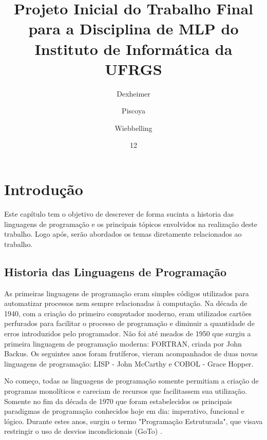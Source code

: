 \documentclass[rel_mlp]{iiufrgs}
\title{Projeto Inicial  do Trabalho Final para a Disciplina de MLP do Instituto de Informática da UFRGS}
\author{Dexheimer}{André}
\author{Piscoya}{Gabriel}
\author{Wiebbelling}{Rodrigo}
\date{12}{2017}
\begin{document}
\maketitle      


\tableofcontents









\chapter{Introdução} \label{intro}
Este capítulo tem o objetivo de descrever de forma sucinta a historia das linguagens de programação e os principais tópicos envolvidos na realização deste trabalho. Logo após, serão abordados os temas diretamente relacionados ao trabalho. 

\section{Historia das Linguagens de Programação}
As primeiras linguagens de programação eram simples códigos utilizados para automatizar processos nem sempre relacionadas à computação. Na década de 1940, com a criação do primeiro computador moderno, eram utilizados cartões perfurados para facilitar o processo de programação e diminuir a quantidade de erros introduzidos pelo programador. Não foi até meados de 1950 que surgiu a primeira linguagem de programação moderna: FORTRAN, criada por John Backus. Os seguintes anos foram frutíferos, vieram acompanhados de duas novas linguagens de programação: LISP - John McCarthy e COBOL - Grace Hopper.

No começo, todas as linguagens de programação somente permitiam a criação de programas monolíticos e careciam de recursos que facilitassem sua utilização. Somente no fim da década de 1970 que foram estabelecidos os principais paradigmas de programação conhecidos hoje em dia: imperativo, funcional e lógico.
Durante estes anos, surgiu o termo "Programação Estruturada", que visava restringir o uso de desvios incondicionais (GoTo) \cite{organick2014programming}.
\end{document}
